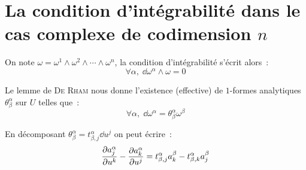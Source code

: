 \documentclass[a4paper,draft]{amsart}
\begin{document}
\section{La condition d'intégrabilité dans le cas complexe de codimension $n$}
On note $\omega = \omega^1 \wedge \omega^2 \wedge \cdots \wedge \omega^n$, la condition d'intégrabilité s'écrit alors~:
\[
\forall \alpha, \; \dd \omega^\alpha \wedge \omega = 0
\]

Le lemme de \textsc{De Rham} nous donne l'existence (effective) de $1$-formes analytiques $\theta_\beta^\alpha$ sur $U$ telles que~:
\[
\forall \alpha, \; \dd \omega^\alpha = \theta_\beta^\alpha \omega^\beta
\]

En décomposant $\theta_\beta^\alpha = t_{\beta,j}^\alpha \dd u^j$ on peut écrire~:
\[
\dfrac{\partial{a^\alpha_j}}{\partial{u^k}} - \dfrac{\partial{a^\alpha_k}}{\partial{u^j}} = t_{\beta,j}^\alpha a^\beta_k - t_{\beta,k}^\alpha a^\beta_j
\]


\pagebreak


\end{document}
